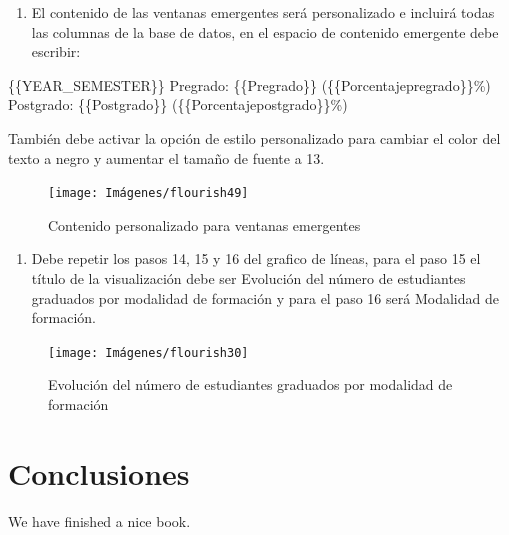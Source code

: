 \documentclass[
]{book}
\providecommand{\tightlist}{%
  \setlength{\itemsep}{0pt}\setlength{\parskip}{0pt}}
\begin{document}
\begin{enumerate}
\def\labelenumi{\arabic{enumi}.}
\setcounter{enumi}{6}
\tightlist
\item
  El contenido de las ventanas emergentes será personalizado e incluirá todas las columnas de la base de datos, en el espacio de contenido emergente debe escribir:
\end{enumerate}

\{\{YEAR\_SEMESTER\}\}
Pregrado: \{\{Pregrado\}\} (\{\{Porcentajepregrado\}\}\%)
Postgrado: \{\{Postgrado\}\} (\{\{Porcentajepostgrado\}\}\%)

También debe activar la opción de estilo personalizado para cambiar el color del texto a negro y aumentar el tamaño de fuente a 13.

\begin{figure}

{\centering \texttt{[image: Imágenes/flourish49]} 

}

\caption{Contenido personalizado para ventanas emergentes}\label{fig:paso7lineassegmentadaflourish-fig}
\end{figure}

\begin{enumerate}
\def\labelenumi{\arabic{enumi}.}
\setcounter{enumi}{7}
\tightlist
\item
  Debe repetir los pasos 14, 15 y 16 del grafico de líneas, para el paso 15 el título de la visualización debe ser Evolución del número de estudiantes graduados por modalidad de formación y para el paso 16 será Modalidad de formación.
\end{enumerate}

\begin{figure}

{\centering \texttt{[image: Imágenes/flourish30]} 

}

\caption{Evolución del número de estudiantes graduados por modalidad de formación}\label{fig:paso8lineassegmentadaflourish-fig}
\end{figure}

\hypertarget{conclu}{%
\chapter{Conclusiones}\label{conclu}}

We have finished a nice book.

  
\end{document}

